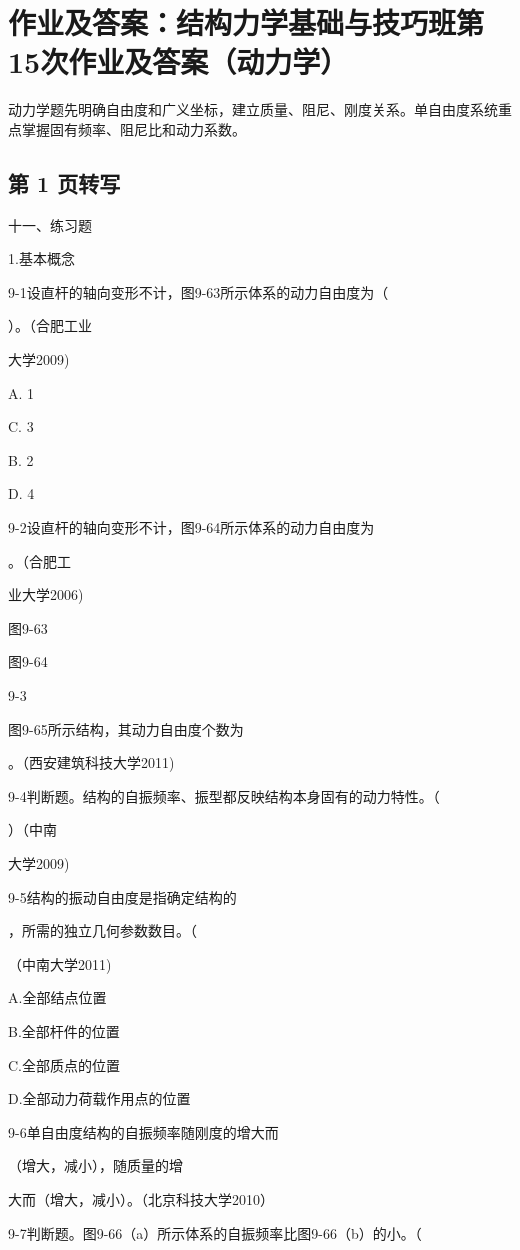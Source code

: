 \section{作业及答案：结构力学基础与技巧班第15次作业及答案（动力学）}
\begin{analysisbox}
动力学题先明确自由度和广义坐标，建立质量、阻尼、刚度关系。单自由度系统重点掌握固有频率、阻尼比和动力系数。
\end{analysisbox}
\subsection*{第 1 页转写}
十一、练习题

1.基本概念

9-1设直杆的轴向变形不计，图9-63所示体系的动力自由度为（

）。（合肥工业

大学2009)

A. 1

C. 3

B. 2

D. 4

9-2设直杆的轴向变形不计，图9-64所示体系的动力自由度为

。（合肥工

业大学2006)

图9-63

图9-64

9-3

图9-65所示结构，其动力自由度个数为

。（西安建筑科技大学2011)

9-4判断题。结构的自振频率、振型都反映结构本身固有的动力特性。（

）（中南

大学2009)

9-5结构的振动自由度是指确定结构的

，所需的独立几何参数数目。（

（中南大学2011)

A.全部结点位置

B.全部杆件的位置

C.全部质点的位置

D.全部动力荷载作用点的位置

9-6单自由度结构的自振频率随刚度的增大而

（增大，减小），随质量的增

大而（增大，减小）。（北京科技大学2010）

9-7判断题。图9-66（a）所示体系的自振频率比图9-66（b）的小。（

